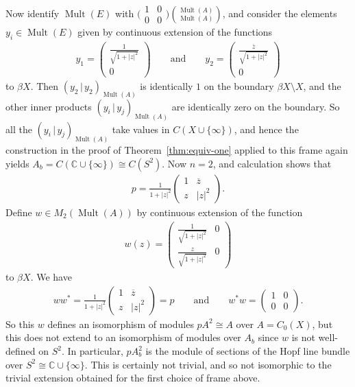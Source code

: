 \documentclass[10pt,a4paper]{amsart}
\numberwithin{equation}{section}
\DeclareMathOperator{\Mult}{Mult} %
\newcommand{\C}{\mathbb{C}} %
\newcommand{\ol}[1]{\overline{#1}} %
\begin{document}
\begin{Example}
Now identify $\Mult(E)$ with $\big(\begin{smallmatrix} 1 & 0 \\0 & 0 \end{smallmatrix}\big) \binom{\Mult(A)}{\Mult(A)}$, and consider the elements
$y_i \in \Mult(E)$ given by continuous extension of the functions
\begin{gather*}
y_1=\begin{pmatrix} \frac{1}{\sqrt{1+|z|^2}} \\ 0\end{pmatrix}\qquad\mbox{and}\qquad
y_2=\begin{pmatrix} \frac{\ol{z}}{\sqrt{1+|z|^2}} \\ 0\end{pmatrix}
\end{gather*}
to $\beta X$. Then $(y_2 \,|\, y_2)_{\Mult(A)}$ is identically $1$ on the boundary $\beta X \setminus X$, and the other inner products $(y_i \,|\, y_j)_{\Mult(A)}$ are identically zero on the boundary. So all the $(y_i \,|\, y_j)_{\Mult(A)}$ take values in $C(X \cup \{\infty\})$, and hence the construction in the proof of Theorem~\ref{thm:equiv-one} applied to this frame again yields $A_b = C(\C \cup\{\infty\}) \cong C(S^2)$. Now $n =
2$, and calculation shows that
\begin{gather*}
p = \frac{1}{1+|z|^2}\begin{pmatrix} 1 & \ol{z}\\ z & |z|^2\end{pmatrix}.
\end{gather*}
Def\/ine $w\in M_2(\Mult(A))$ by continuous extension of the function
\begin{gather*}
w(z) = \begin{pmatrix} \frac{1}{\sqrt{1+|z|^2}} & 0\\ \frac{z}{\sqrt{1+|z|^2}} & 0\end{pmatrix}
\end{gather*}
to $\beta X$. We have
\begin{gather*}
ww^*=\frac{1}{1+|z|^2}\begin{pmatrix} 1 & \ol{z}\\ z & |z|^2\end{pmatrix} = p\qquad\mbox{and}\qquad
w^*w=\begin{pmatrix} 1 & 0\\ 0 & 0\end{pmatrix}.
\end{gather*}
So this $w$ def\/ines an isomorphism of modules $pA^2 \cong A$ over $A = C_0(X)$, but this does not extend to an isomorphism of modules over $A_b$ since $w$ is not well-def\/ined on $S^2$. In particular, $p A_b^2$ is the module of sections of the Hopf line bundle over $S^2 \cong \C \cup \{\infty\}$. This is certainly not trivial, and so not isomorphic to the trivial extension obtained for the f\/irst choice of frame above.
\end{Example}
\end{document}
